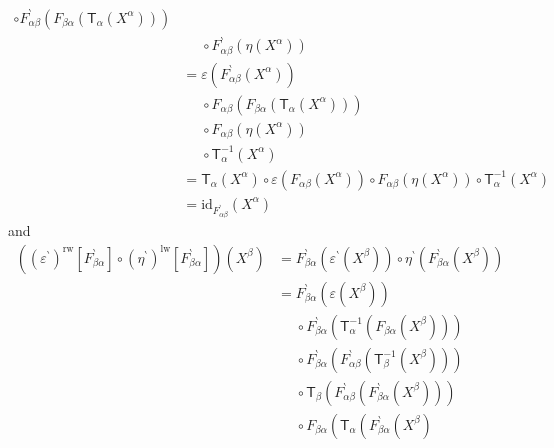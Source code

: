 \begin{prf}
\begin{enumerate}
\begin{align*}
  \circ
  F_{\alpha\beta}^{\backprime}
  \left(
    F_{\beta\alpha}
    \left(
      \mathsf{T}_{\alpha}(X^{\alpha})
    \right)
  \right)
  \\
  &\phantom{=}
  \circ
  F_{\alpha\beta}^{\backprime}
  \left(
    \eta(X^{\alpha})
  \right)
  \\
  &=
  \varepsilon
  \left(
    F_{\alpha\beta}^{\backprime}(X^{\alpha})
  \right)
  \\
  &\phantom{=}
  \circ
  F_{\alpha\beta}
  \left(
    F_{\beta\alpha}
    \left(
      \mathsf{T}_{\alpha}(X^{\alpha})
    \right)
  \right)
  \\
  &\phantom{=}
  \circ
  F_{\alpha\beta}
  \left(
    \eta(X^{\alpha})
  \right)
  \\
  &\phantom{=}
  \circ
  \mathsf{T}_{\alpha}^{-1}(X^{\alpha})
  \tag{NT}
  \\
  &=
  \mathsf{T}_{\alpha}(X^{\alpha})
  \circ
  \varepsilon
  \left(
    F_{\alpha\beta}(X^{\alpha})
  \right)
  \circ
  F_{\alpha\beta}
  \left(
    \eta(X^{\alpha})
  \right)
  \circ
  \mathsf{T}_{\alpha}^{-1}(X^{\alpha})
  \tag{NT}
  \\
  &=
  \mathrm{id}_{F_{\alpha\beta}^{\backprime}}(X^{\alpha})
\end{align*}
and
\begin{align*}
  \left(
    (\varepsilon^{\backprime})^{\textrm{rw}}[F_{\beta\alpha}^{\backprime}]
    \circ
    (\eta^{\backprime})^{\textrm{lw}}[F_{\beta\alpha}^{\backprime}]
  \right)
  (X^{\beta})
  &=
  F_{\beta\alpha}^{\backprime}
  \left(
    \varepsilon^{\backprime}(X^{\beta})
  \right)
  \circ
  \eta^{\backprime}
  \left(
    F_{\beta\alpha}^{\backprime}(X^{\beta})
  \right)
  \\
  &=
  F_{\beta\alpha}^{\backprime}
  \left(
    \varepsilon(X^{\beta})
  \right)
  \\
  &\phantom{=}
  \circ
  F_{\beta\alpha}^{\backprime}
  \left(
    \mathsf{T}_{\alpha}^{-1}
    \left(
      F_{\beta\alpha}(X^{\beta})
    \right)
  \right)
  \\
  &\phantom{=}
  \circ
  F_{\beta\alpha}^{\backprime}
  \left(
    F_{\alpha\beta}^{\backprime}
    \left(
      \mathsf{T}_{\beta}^{-1}(X^{\beta})
    \right)
  \right)
  \\
  &\phantom{=}
  \circ
  \mathsf{T}_{\beta}
  \left(
    F_{\alpha\beta}^{\backprime}
    \left(
      F_{\beta\alpha}^{\backprime}(X^{\beta})
    \right)
  \right)
  \\
  &\phantom{=}
  \circ
  F_{\beta\alpha}
  \left(
    \mathsf{T}_{\alpha}
    \left(
      F_{\beta\alpha}^{\backprime}(X^{\beta})

\end{align*}
\end{enumerate}
\end{prf}
